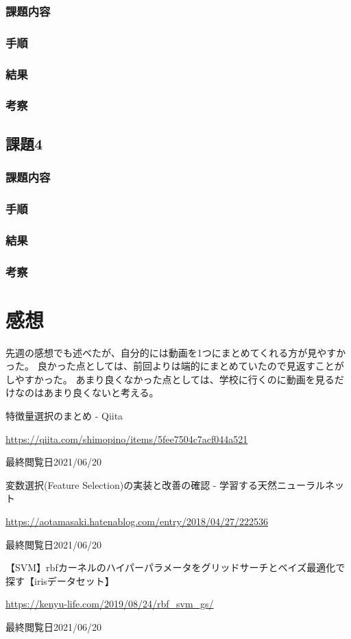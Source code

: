 \documentclass[12pt]{jarticle}
\begin{document}
\subsubsection*{課題内容}
\subsubsection*{手順}
\subsubsection*{結果}
\subsubsection*{考察}
\subsection{課題4}
\subsubsection*{課題内容}
\subsubsection*{手順}
\subsubsection*{結果}
\subsubsection*{考察}

\section{感想}
先週の感想でも述べたが、自分的には動画を1つにまとめてくれる方が見やすかった。
良かった点としては、前回よりは端的にまとめていたので見返すことがしやすかった。
あまり良くなかった点としては、学校に行くのに動画を見るだけなのはあまり良くないと考える。

\begin{thebibliography}{99}
    \label{sannkoubunnkenn_chapter}
    特徴量選択のまとめ - Qiita

    \url{https://qiita.com/shimopino/items/5fee7504c7acf044a521}

    最終閲覧日2021/06/20

    変数選択(Feature Selection)の実装と改善の確認 - 学習する天然ニューラルネット

    \url{https://aotamasaki.hatenablog.com/entry/2018/04/27/222536}

    最終閲覧日2021/06/20

    【SVM】rbfカーネルのハイパーパラメータをグリッドサーチとベイズ最適化で探す【irisデータセット】

    \url{https://kenyu-life.com/2019/08/24/rbf_svm_gs/}

    最終閲覧日2021/06/20
\end{thebibliography}
\end{document}
